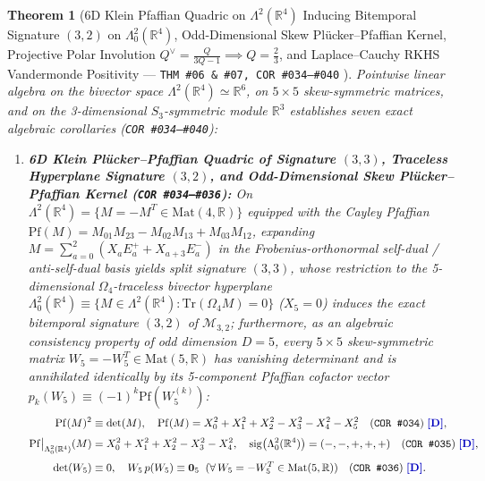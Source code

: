 \documentclass[11pt,a4paper]{article}
\newcommand{\catD}{\text{\textbf{\textcolor{blue!75!black}{[D]}}}}
\theoremstyle{definition}
\theoremstyle{plain}
\newtheorem{theorem}[axiom]{Theorem}
\theoremstyle{remark}
\begin{document}
\begin{theorem}[{6D Klein Pfaffian Quadric on $\Lambda^2(\mathbb{R}^4)$ Inducing Bitemporal Signature $(3,2)$ on $\Lambda^2_0(\mathbb{R}^4)$, Odd-Dimensional Skew Pl\"ucker--Pfaffian Kernel, Projective Polar Involution $Q^\vee = \frac{Q}{3Q - 1} \implies Q = \frac{2}{3}$, and Laplace--Cauchy RKHS Vandermonde Positivity --- \texttt{THM~\#06 \& \#07, COR~\#034--\#040} \catD}]\label{thm:c1_klein_and_cauchy}
Pointwise linear algebra on the bivector space $\Lambda^2(\mathbb{R}^4) \simeq \mathbb{R}^6$, on $5\times 5$ skew-symmetric matrices, and on the 3-dimensional $S_3$-symmetric module $\mathbb{R}^3$ establishes seven exact algebraic corollaries (\texttt{COR~\#034--\#040}):
\begin{enumerate}[label=(\roman*)]
  \item \textbf{6D Klein Pl\"ucker--Pfaffian Quadric of Signature $(3,3)$, Traceless Hyperplane Signature $(3,2)$, and Odd-Dimensional Skew Pl\"ucker--Pfaffian Kernel (\texttt{COR~\#034--\#036}):}
  On $\Lambda^2(\mathbb{R}^4) = \{M = -M^T \in \mathrm{Mat}(4, \mathbb{R})\}$ equipped with the Cayley Pfaffian $\mathrm{Pf}(M) = M_{01}M_{23} - M_{02}M_{13} + M_{03}M_{12}$, expanding $M = \sum_{a=0}^{2}(X_a E_a^+ + X_{a+3} E_a^-)$ in the Frobenius-orthonormal self-dual / anti-self-dual basis yields split signature $(3,3)$, whose restriction to the 5-dimensional $\Omega_4$-traceless bivector hyperplane $\Lambda^2_0(\mathbb{R}^4) \equiv \{M \in \Lambda^2(\mathbb{R}^4) : \mathrm{Tr}(\Omega_4 M) = 0\}$ ($X_5 = 0$) induces the exact bitemporal signature $(3,2)$ of $\mathcal{M}_{3,2}$; furthermore, as an algebraic consistency property of odd dimension $D = 5$, every $5\times 5$ skew-symmetric matrix $W_5 = -W_5^T \in \mathrm{Mat}(5, \mathbb{R})$ has vanishing determinant and is annihilated identically by its 5-component Pfaffian cofactor vector $p_k(W_5) \equiv (-1)^k\mathrm{Pf}(W_5^{(k)})$:
  \begin{align}
  \mathrm{Pf}(M)^2 &\equiv \det(M), \quad
  \mathrm{Pf}(M) = X_0^2 + X_1^2 + X_2^2 - X_3^2 - X_4^2 - X_5^2 \quad \textnormal{(\texttt{COR~\#034})} \;\catD, \nonumber \\[3pt]
  \mathrm{Pf}\big|_{\Lambda^2_0(\mathbb{R}^4)}(M) &= X_0^2 + X_1^2 + X_2^2 - X_3^2 - X_4^2, \quad
  \mathrm{sig}\!\left(\Lambda^2_0(\mathbb{R}^4)\right) = (-,-,+,+,+) \quad \textnormal{(\texttt{COR~\#035})} \;\catD, \nonumber \\[3pt]
  \det(W_5) &\equiv 0, \quad
  W_5\,p(W_5) \equiv \mathbf{0}_5 \;\; (\forall\,W_5 = -W_5^T \in \mathrm{Mat}(5, \mathbb{R})) \quad \textnormal{(\texttt{COR~\#036})} \;\catD. \label{eq:c1_klein_pfaffian_signature}

\end{align}
\end{enumerate}
\end{theorem}
\end{document}
